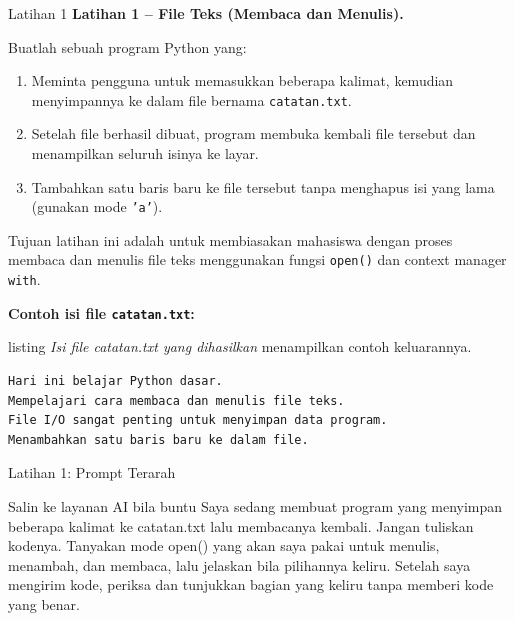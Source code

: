 \documentclass[aspectratio=169, table]{beamer}
\begin{document}
\begin{frame}[fragile,allowframebreaks=0.8]{Latihan 1}
\footnotesize
\textbf{Latihan 1 – File Teks (Membaca dan Menulis).}\par\medskip
Buatlah sebuah program Python yang:
\begin{enumerate}
    \item Meminta pengguna untuk memasukkan beberapa kalimat, kemudian menyimpannya ke dalam file bernama \texttt{catatan.txt}.  
    \item Setelah file berhasil dibuat, program membuka kembali file tersebut dan menampilkan seluruh isinya ke layar.  
    \item Tambahkan satu baris baru ke file tersebut tanpa menghapus isi yang lama (gunakan mode \texttt{'a'}).  
\end{enumerate}

Tujuan latihan ini adalah untuk membiasakan mahasiswa dengan proses membaca dan menulis file teks menggunakan fungsi \texttt{open()} dan context manager \texttt{with}.

\noindent\textbf{Contoh isi file \texttt{catatan.txt}:}

listing \textit{Isi file catatan.txt yang dihasilkan} menampilkan contoh keluarannya.

\begin{lstlisting}[language=bash, breaklines=true, basicstyle=\ttfamily\scriptsize]
Hari ini belajar Python dasar.
Mempelajari cara membaca dan menulis file teks.
File I/O sangat penting untuk menyimpan data program.
Menambahkan satu baris baru ke dalam file.
\end{lstlisting}
\end{frame}

\begin{frame}{Latihan 1: Prompt Terarah}
\begin{block}{Salin ke layanan AI bila buntu}
\small Saya sedang membuat program yang menyimpan beberapa kalimat ke catatan.txt lalu membacanya kembali. Jangan tuliskan kodenya. Tanyakan mode open() yang akan saya pakai untuk menulis, menambah, dan membaca, lalu jelaskan bila pilihannya keliru. Setelah saya mengirim kode, periksa dan tunjukkan bagian yang keliru tanpa memberi kode yang benar.
\end{block}
\end{frame}
\end{document}
